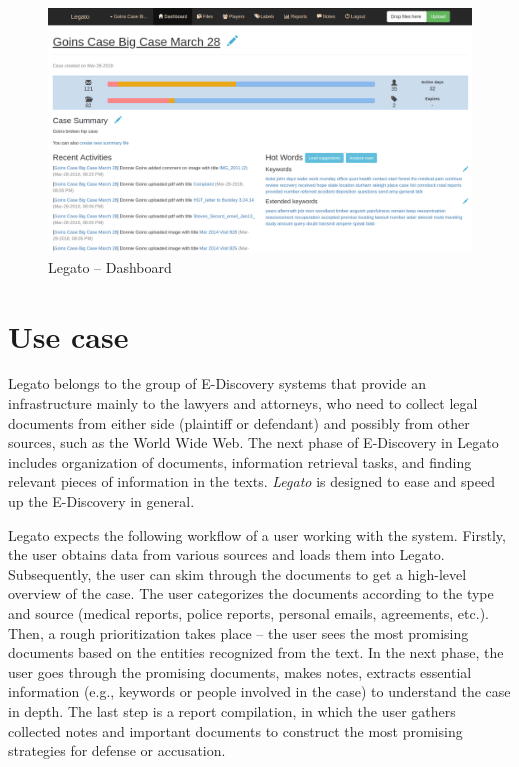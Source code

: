 \documentclass[
  digital, %
  notable,   %
  nolof,     %
  nolot,     %
]{fithesis3}
\begin{document}
\begin{figure}[h]
\caption{Legato -- Dashboard}
\label{fig:legato_dashboard}
\includegraphics[width=\textwidth]{img/Legato-Dashboard}
\end{figure}

\section{Use case}
\label{sec:legato_usecase}
Legato belongs to the group of E-Discovery systems that provide an infrastructure mainly to the lawyers and attorneys, who need to collect legal documents from either side (plaintiff or defendant) and possibly from other sources, such as the World Wide Web.
The next phase of E-Discovery in Legato includes organization of documents, information retrieval tasks, and finding relevant pieces of information in the texts.
\textit{Legato} is designed to ease and speed up the E-Discovery in general.

Legato expects the following workflow of a user working with the system.
Firstly, the user obtains data from various sources and loads them into Legato.
Subsequently, the user can skim through the documents to get a high-level overview of the case.
The user categorizes the documents according to the type and source (medical reports, police reports, personal emails, agreements, etc.).
Then, a rough prioritization takes place -- the user sees the most promising documents based on the entities recognized from the text.
In the next phase, the user goes through the promising documents, makes notes, extracts essential information (e.g., keywords or people involved in the case) to understand the case in depth.
The last step is a report compilation, in which the user gathers collected notes and important documents to construct the most promising strategies for defense or accusation.
\end{document}
